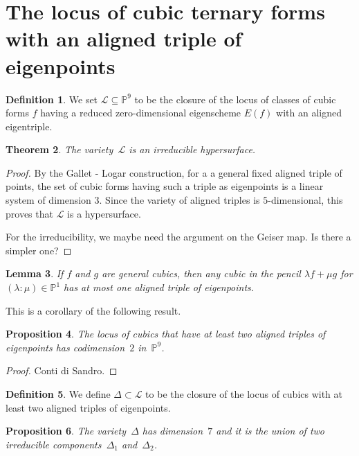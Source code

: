 \documentclass[11pt, a4paper, reqno, captions=tableheading,bibliography=totoc]{scrartcl}
\theoremstyle{plain}
\newtheorem{lemma}{Lemma}[section]
\newtheorem{prop}[lemma]{Proposition}
\newtheorem{theorem}[lemma]{Theorem}
\theoremstyle{definition}
\newtheorem{definition}[lemma]{Definition}
\newcommand{\p}{\mathbb{P}}
\begin{document}
\section{The locus of cubic ternary forms with an aligned triple of eigenpoints}
\label{locus_one_alignment}

\begin{definition}
 We set $\mathcal{L} \subseteq \p^9$ to be the closure of the locus of classes of cubic forms $f$ having a reduced zero-dimensional eigenscheme $E(f)$ with an aligned eigentriple.
\end{definition}

\begin{theorem}
The variety~$\mathcal{L}$ is an irreducible hypersurface.
\end{theorem}

\begin{proof}
By the Gallet - Logar construction, for a a general fixed aligned triple of points, the set of cubic forms having such a triple as eigenpoints is a linear system of dimension 3. Since the variety of aligned triples is $5$-dimensional, this proves that $\mathcal{L}$ is a hypersurface.

For the irreducibility, we maybe need the argument on the Geiser map. Is there a simpler one?
\end{proof}

\begin{lemma}
\label{lemma:pencil_one_aligned}
 If $f$ and $g$ are general cubics, then any cubic in the pencil $\lambda f + \mu g$ for $(\lambda: \mu) \in \p^1$ has at most one aligned triple of eigenpoints.
\end{lemma}

This is a corollary of the following result.

\begin{prop}
    The locus of cubics that have at least two aligned triples of eigenpoints has codimension~$2$ in~$\p^9$.
\end{prop}
\begin{proof}
    Conti di Sandro.
\end{proof}

\begin{definition}
 We define $\Delta \subset \mathcal{L}$ to be the closure of the locus of cubics with at least two aligned triples of eigenpoints.
\end{definition}

\begin{prop}
  The variety~$\Delta$ has dimension~$7$ and it is the union of two irreducible components~$\Delta_1$ and~$\Delta_2$.
\end{prop}
\end{document}
